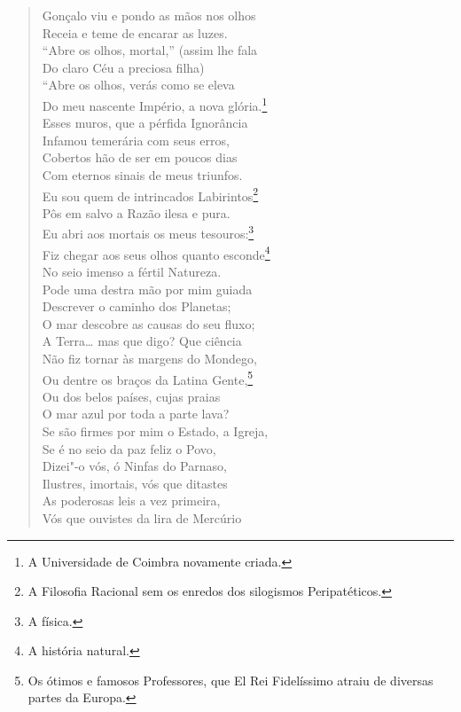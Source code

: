 \begin{verse}
Gonçalo viu e pondo as mãos nos olhos\\
Receia e teme de encarar as luzes.\\
``Abre os olhos, mortal,'' (assim lhe fala\\
Do claro Céu a preciosa filha)\\
``Abre os olhos, verás como se eleva\\
Do meu nascente Império, a nova glória.\footnote{ A Universidade de Coimbra novamente criada.}\\
Esses muros, que a pérfida Ignorância\\			\index{\Ignor}
Infamou temerária com seus erros,\\
Cobertos hão de ser em poucos dias\\
Com eternos sinais de meus triunfos.\\
Eu sou quem de intrincados Labirintos\footnote{ A Filosofia Racional
sem os enredos dos silogismos Peripatéticos.}\\	\index{\Perip}
Pôs em salvo a Razão ilesa e pura.\\		\index{\Fisic}
Eu abri aos mortais os 
meus tesouros:\footnote{ A física.}\\	\index{\Fisic}
Fiz chegar aos seus olhos quanto esconde\footnote{ A história natural.}\\		\index{\Fisic}
No seio imenso a fértil Natureza.\\
Pode uma destra mão por mim guiada\\
Descrever o caminho dos Planetas;\\
O mar descobre as causas do seu fluxo;\\
A Terra\ldots{} mas que digo? Que ciência\\
Não fiz tornar às margens do Mondego,\\		\index{\Monde}
Ou dentre os braços da Latina Gente,\footnote{ Os ótimos e famosos
Professores, que El Rei Fidelíssimo atraiu de diversas partes da Europa.}\\
Ou dos belos países, cujas praias\\
O mar azul por toda a parte lava?\\
Se são firmes por mim o Estado, a Igreja,\\
Se é no seio da paz feliz o Povo,\\
Dizei"-o vós, ó Ninfas do Parnaso,\\
Ilustres, imortais, vós que ditastes\\
As poderosas leis a vez primeira,\\
Vós que ouvistes da lira de Mercúrio\\

\end{verse}
